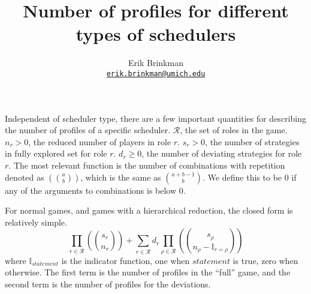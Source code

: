 \documentclass{article}
\newcommand{\reps}[2]{\left(\!\!{#1\choose #2}\!\!\right)}
\begin{document}
\title{Number of profiles for different types of schedulers}
\author{Erik Brinkman\\\texttt{\href{mailto:erik.brinkman@umich.edu}{erik.brinkman@umich.edu}}}
\maketitle

Independent of scheduler type, there are a few important quantities for describing the number of profiles of a specific scheduler.
$\mathcal R$, the set of roles in the game.
$n_r > 0$, the reduced number of players in role $r$.
$s_r > 0$, the number of strategies in fully explored set for role $r$.
$d_r \ge 0$, the number of deviating strategies for role $r$.
The most relevant function is the number of combinations with repetition denoted as $\reps{a}{b}$, which is the same as $a + b - 1 \choose b$.
We define this to be 0 if any of the arguments to combinations is below 0.

For normal games, and games with a hierarchical reduction, the closed form is relatively simple.
\begin{equation*}
    \prod_{r \in \mathcal R} \reps{s_r}{n_r} + \sum_{r \in \mathcal R} d_r \prod_{\rho \in \mathcal R} \reps{s_\rho}{n_\rho - \mathbb{I}_{r = \rho}}
\end{equation*}
where $\mathbb{I}_{statement}$ is the indicator function, one when $statement$ is true, zero when otherwise.
The first term is the number of profiles in the ``full'' game, and the second term is the number of profiles for the deviations.
\end{document}
